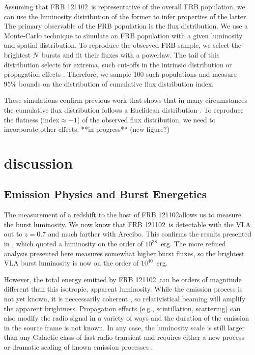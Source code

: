 \documentclass[twocolumn]{aastex61}
\newcommand{\frb}{FRB 121102}
\begin{document}
Assuming that \frb\ is representative of the overall FRB population, we can use the luminosity distribution of the former to infer properties of the latter. The primary observable of the FRB population is the flux distribution. We use a Monte-Carlo technique to simulate an FRB population with a given luminosity and spatial distribution. To reproduce the observed FRB sample, we select the brightest $N$\ bursts and fit their fluxes with a powerlaw. The tail of this distribution selects for extrema, such cut-offs in the intrinsic distribution or propagation effects \citep{2015MNRAS.451.3278M, CORDES}. Therefore, we sample 100 such populations and measure 95\% bounds on the distribution of cumulative flux distribution index.

These simulations confirm previous work that shows that in many circumstances the cumulative flux distribution follows a Euclidean distribution \citep[index = --1.5;][]{2016MNRAS.462..941L}. To reproduce the flatness (index$\approx-1$) of the observed flux distribution, we need to incorporate other effects. 
**in progress** (new figure?)


\section{discussion}

\subsection{Emission Physics and Burst Energetics}
The measurement of a redshift to the host of \frb allows us to measure the burst luminosity. We now know that \frb\ is detectable with the VLA out to $z=0.7$ and much farther with Arecibo. This confirms the results presented in \citet{LOC}, which quoted a luminosity on the order of $10^{38}$\ erg. The more refined analysis presented here measures somewhat higher burst fluxes, so the brightest VLA burst luminosity is now on the order of $10^{40}$\ erg. 

However, the total energy emitted by \frb\ can be orders of magnitude different than this isotropic, apparent luminosity. While the emission process is not yet known, it is neccessarily coherent \citep{2016Natur.531..202S, WEIRD}, so relativistical beaming will amplify the apparent brightness. Propagation effects (e.g., scintillation, scattering) can also modify the radio signal in a variety of ways \citep{CORDES} and the duration of the emission in the source frame is not known. In any case, the luminosity scale is still larger than any Galactic class of fast radio transient and requires either a new process or dramatic scaling of known emission processes \citep{2016MNRAS.462..941L, 2016MNRAS.457..232C}.
\end{document}
